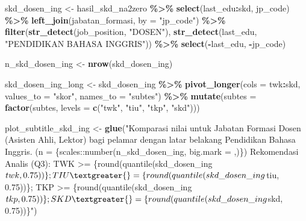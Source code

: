 \documentclass[
]{article}
\newenvironment{Shaded}{\begin{snugshade}}{\end{snugshade}}
\newcommand{\AttributeTok}[1]{\textcolor[rgb]{0.13,0.29,0.53}{#1}}
\newcommand{\FunctionTok}[1]{\textcolor[rgb]{0.13,0.29,0.53}{\textbf{#1}}}
\newcommand{\NormalTok}[1]{#1}
\newcommand{\OtherTok}[1]{\textcolor[rgb]{0.56,0.35,0.01}{#1}}
\newcommand{\SpecialCharTok}[1]{\textcolor[rgb]{0.81,0.36,0.00}{\textbf{#1}}}
\newcommand{\StringTok}[1]{\textcolor[rgb]{0.31,0.60,0.02}{#1}}
\begin{document}
\begin{Shaded}
\begin{Highlighting}[]
\NormalTok{skd\_dosen\_ing }\OtherTok{\textless{}{-}}\NormalTok{ hasil\_skd\_na2zero }\SpecialCharTok{\%\textgreater{}\%} 
  \FunctionTok{select}\NormalTok{(last\_edu}\SpecialCharTok{:}\NormalTok{skd, jp\_code) }\SpecialCharTok{\%\textgreater{}\%} 
  \FunctionTok{left\_join}\NormalTok{(jabatan\_formasi, }\AttributeTok{by =} \StringTok{"jp\_code"}\NormalTok{) }\SpecialCharTok{\%\textgreater{}\%} 
  \FunctionTok{filter}\NormalTok{(}\FunctionTok{str\_detect}\NormalTok{(job\_position, }\StringTok{"DOSEN"}\NormalTok{),}
         \FunctionTok{str\_detect}\NormalTok{(last\_edu, }\StringTok{"PENDIDIKAN BAHASA INGGRIS"}\NormalTok{)) }\SpecialCharTok{\%\textgreater{}\%} 
  \FunctionTok{select}\NormalTok{(}\SpecialCharTok{{-}}\NormalTok{last\_edu, }\SpecialCharTok{{-}}\NormalTok{jp\_code)}


\NormalTok{n\_skd\_dosen\_ing }\OtherTok{\textless{}{-}} \FunctionTok{nrow}\NormalTok{(skd\_dosen\_ing)}

\NormalTok{skd\_dosen\_ing\_long }\OtherTok{\textless{}{-}}\NormalTok{ skd\_dosen\_ing }\SpecialCharTok{\%\textgreater{}\%}
  \FunctionTok{pivot\_longer}\NormalTok{(}\AttributeTok{cols =}\NormalTok{ twk}\SpecialCharTok{:}\NormalTok{skd,}
               \AttributeTok{values\_to =} \StringTok{"skor"}\NormalTok{,}
               \AttributeTok{names\_to =} \StringTok{"subtes"}\NormalTok{) }\SpecialCharTok{\%\textgreater{}\%} 
  \FunctionTok{mutate}\NormalTok{(}\AttributeTok{subtes =} \FunctionTok{factor}\NormalTok{(subtes, }\AttributeTok{levels =} \FunctionTok{c}\NormalTok{(}\StringTok{"twk"}\NormalTok{, }\StringTok{"tiu"}\NormalTok{, }\StringTok{"tkp"}\NormalTok{, }\StringTok{"skd"}\NormalTok{)))}

\NormalTok{plot\_subtitle\_skd\_ing }\OtherTok{\textless{}{-}} \FunctionTok{glue}\NormalTok{(}\StringTok{"Komparasi nilai untuk Jabatan Formasi Dosen (Asisten Ahli, Lektor) bagi pelamar }
\StringTok{                              dengan latar belakang Pendidikan Bahasa Inggris. (n = \{scales::number(n\_skd\_dosen\_ing, big.mark = \textquotesingle{},\textquotesingle{})\})}
\StringTok{                              Rekomendasi Analis (Q3):}
\StringTok{                              TWK \textgreater{}= \{round(quantile(skd\_dosen\_ing$twk, 0.75))\}; TIU \textgreater{}= \{round(quantile(skd\_dosen\_ing$tiu, 0.75))\}; TKP \textgreater{}= \{round(quantile(skd\_dosen\_ing$tkp, 0.75))\}; SKD \textgreater{}= \{round(quantile(skd\_dosen\_ing$skd, 0.75))\}"}\NormalTok{)}


\end{Highlighting}
\end{Shaded}
\end{document}
